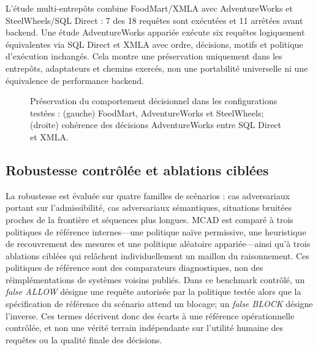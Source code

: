\documentclass[journal]{IEEEtran}
\begin{document}


L'étude multi-entrepôts combine FoodMart/XMLA avec AdventureWorks et SteelWheels/SQL Direct : 7 des 18 requêtes sont exécutées et 11 arrêtées avant backend. Une étude AdventureWorks appariée exécute six requêtes logiquement équivalentes via SQL Direct et XMLA avec ordre, décisions, motifs et politique d'exécution inchangés. Cela montre une préservation uniquement dans les entrepôts, adaptateurs et chemins exercés, non une portabilité universelle ni une équivalence de performance backend.

\begin{figure}[!t]
\centering
\begin{minipage}[t]{0.49\textwidth}\centering\end{minipage}\hfill
\begin{minipage}[t]{0.49\textwidth}\centering\end{minipage}
\caption{Préservation du comportement décisionnel dans les configurations testées : (gauche) FoodMart, AdventureWorks et SteelWheels; (droite) cohérence des décisions AdventureWorks entre SQL Direct et XMLA.}
\label{fig:portability}
\end{figure}

\subsection{Robustesse contrôlée et ablations ciblées}

La robustesse est évaluée sur quatre familles de scénarios : cas adversariaux portant sur l'admissibilité, cas adversariaux sémantiques, situations bruitées proches de la frontière et séquences plus longues. MCAD est comparé à trois politiques de référence internes---une politique naïve permissive, une heuristique de recouvrement des mesures et une politique aléatoire appariée---ainsi qu'à trois ablations ciblées qui relâchent individuellement un maillon du raisonnement. Ces politiques de référence sont des comparateurs diagnostiques, non des réimplémentations de systèmes voisins publiés. Dans ce benchmark contrôlé, un \emph{false ALLOW} désigne une requête autorisée par la politique testée alors que la spécification de référence du scénario attend un blocage; un \emph{false BLOCK} désigne l'inverse. Ces termes décrivent donc des écarts à une référence opérationnelle contrôlée, et non une vérité terrain indépendante sur l'utilité humaine des requêtes ou la qualité finale des décisions.
\end{document}
